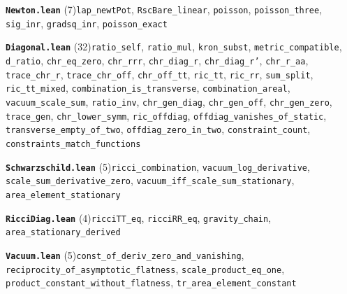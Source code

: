 \documentclass[11pt,a4paper]{article}
\theoremstyle{sudef}
\begin{document}
\noindent\textbf{\texttt{Newton.lean}} (7)\quad \texttt{lap\_\allowbreak newtPot}, \texttt{RscBare\_\allowbreak linear}, \texttt{poisson}, \texttt{poisson\_\allowbreak three}, \texttt{sig\_\allowbreak inr}, \texttt{gradsq\_\allowbreak inr}, \texttt{poisson\_\allowbreak exact}\par\smallskip
\noindent\textbf{\texttt{Diagonal.lean}} (32)\quad \texttt{ratio\_\allowbreak self}, \texttt{ratio\_\allowbreak mul}, \texttt{kron\_\allowbreak subst}, \texttt{metric\_\allowbreak compatible}, \texttt{d\_\allowbreak ratio}, \texttt{chr\_\allowbreak eq\_\allowbreak zero}, \texttt{chr\_\allowbreak rrr}, \texttt{chr\_\allowbreak diag\_\allowbreak r}, \texttt{chr\_\allowbreak diag\_\allowbreak r'}, \texttt{chr\_\allowbreak r\_\allowbreak aa}, \texttt{trace\_\allowbreak chr\_\allowbreak r}, \texttt{trace\_\allowbreak chr\_\allowbreak off}, \texttt{chr\_\allowbreak off\_\allowbreak tt}, \texttt{ric\_\allowbreak tt}, \texttt{ric\_\allowbreak rr}, \texttt{sum\_\allowbreak split}, \texttt{ric\_\allowbreak tt\_\allowbreak mixed}, \texttt{combination\_\allowbreak is\_\allowbreak transverse}, \texttt{combination\_\allowbreak areal}, \texttt{vacuum\_\allowbreak scale\_\allowbreak sum}, \texttt{ratio\_\allowbreak inv}, \texttt{chr\_\allowbreak gen\_\allowbreak diag}, \texttt{chr\_\allowbreak gen\_\allowbreak off}, \texttt{chr\_\allowbreak gen\_\allowbreak zero}, \texttt{trace\_\allowbreak gen}, \texttt{chr\_\allowbreak lower\_\allowbreak symm}, \texttt{ric\_\allowbreak offdiag}, \texttt{offdiag\_\allowbreak vanishes\_\allowbreak of\_\allowbreak static}, \texttt{transverse\_\allowbreak empty\_\allowbreak of\_\allowbreak two}, \texttt{offdiag\_\allowbreak zero\_\allowbreak in\_\allowbreak two}, \texttt{constraint\_\allowbreak count}, \texttt{constraints\_\allowbreak match\_\allowbreak functions}\par\smallskip
\noindent\textbf{\texttt{Schwarzschild.lean}} (5)\quad \texttt{ricci\_\allowbreak combination}, \texttt{vacuum\_\allowbreak log\_\allowbreak derivative}, \texttt{scale\_\allowbreak sum\_\allowbreak derivative\_\allowbreak zero}, \texttt{vacuum\_\allowbreak iff\_\allowbreak scale\_\allowbreak sum\_\allowbreak stationary}, \texttt{area\_\allowbreak element\_\allowbreak stationary}\par\smallskip
\noindent\textbf{\texttt{RicciDiag.lean}} (4)\quad \texttt{ricciTT\_\allowbreak eq}, \texttt{ricciRR\_\allowbreak eq}, \texttt{gravity\_\allowbreak chain}, \texttt{area\_\allowbreak stationary\_\allowbreak derived}\par\smallskip
\noindent\textbf{\texttt{Vacuum.lean}} (5)\quad \texttt{const\_\allowbreak of\_\allowbreak deriv\_\allowbreak zero\_\allowbreak and\_\allowbreak vanishing}, \texttt{reciprocity\_\allowbreak of\_\allowbreak asymptotic\_\allowbreak flatness}, \texttt{scale\_\allowbreak product\_\allowbreak eq\_\allowbreak one}, \texttt{product\_\allowbreak constant\_\allowbreak without\_\allowbreak flatness}, \texttt{tr\_\allowbreak area\_\allowbreak element\_\allowbreak constant}\par\smallskip
\end{document}
